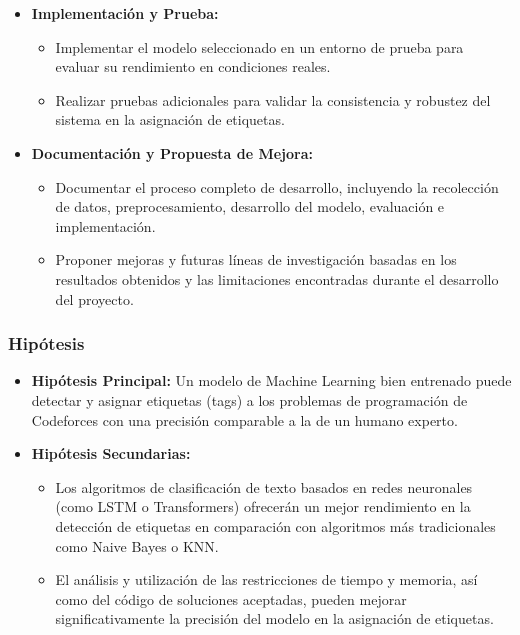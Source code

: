 \documentclass{article}
\begin{document}
\begin{itemize}
    \item \textbf{Implementación y Prueba:}
          \begin{itemize}
              \item Implementar el modelo seleccionado en un entorno de prueba para evaluar su rendimiento en condiciones reales.
              \item Realizar pruebas adicionales para validar la consistencia y robustez del sistema en la asignación de etiquetas.
          \end{itemize}
          
    \item \textbf{Documentación y Propuesta de Mejora:}
          \begin{itemize}
              \item Documentar el proceso completo de desarrollo, incluyendo la recolección de datos, preprocesamiento, desarrollo del modelo, evaluación e implementación.
              \item Proponer mejoras y futuras líneas de investigación basadas en los resultados obtenidos y las limitaciones encontradas durante el desarrollo del proyecto.
          \end{itemize}
\end{itemize}

\subsubsection{Hipótesis}

\begin{itemize}
    \item \textbf{Hipótesis Principal:} Un modelo de Machine Learning bien entrenado puede detectar y asignar etiquetas (tags) a los problemas de programación de Codeforces con una precisión comparable a la de un humano experto.
    \item \textbf{Hipótesis Secundarias:}
          \begin{itemize}
              \item Los algoritmos de clasificación de texto basados en redes neuronales (como LSTM o Transformers) ofrecerán un mejor rendimiento en la detección de etiquetas en comparación con algoritmos más tradicionales como Naive Bayes o KNN.
              \item El análisis y utilización de las restricciones de tiempo y memoria, así como del código de soluciones aceptadas, pueden mejorar significativamente la precisión del modelo en la asignación de etiquetas.
          \end{itemize}
\end{itemize}
\end{document}
